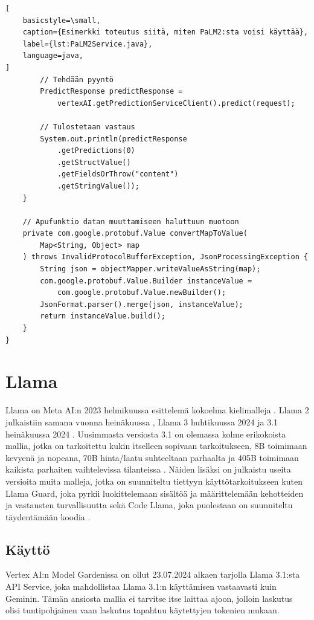 \begin{lstlisting}[
    basicstyle=\small,
    caption={Esimerkki toteutus siitä, miten PaLM2:sta voisi käyttää},
    label={lst:PaLM2Service.java},
    language=java,
]
        // Tehdään pyyntö
        PredictResponse predictResponse =
            vertexAI.getPredictionServiceClient().predict(request);

        // Tulostetaan vastaus
        System.out.println(predictResponse
            .getPredictions(0)
            .getStructValue()
            .getFieldsOrThrow("content")
            .getStringValue());
    }

    // Apufunktio datan muuttamiseen haluttuun muotoon
    private com.google.protobuf.Value convertMapToValue(
        Map<String, Object> map
    ) throws InvalidProtocolBufferException, JsonProcessingException {
        String json = objectMapper.writeValueAsString(map);
        com.google.protobuf.Value.Builder instanceValue =
            com.google.protobuf.Value.newBuilder();
        JsonFormat.parser().merge(json, instanceValue);
        return instanceValue.build();
    }
}
\end{lstlisting}

\section{Llama}

Llama on Meta AI:n 2023 helmikuussa esittelemä kokoelma kielimalleja
\parencite{llama1}. Llama 2 julkaistiin samana vuonna heinäkuussa
\parencite{llama2}, Llama 3 huhtikuussa 2024 \parencite{llama3} ja 3.1
heinäkuussa 2024 \parencite{llama31}. Uusimmasta versiosta 3.1 on olemassa
kolme erikokoista mallia, jotka on tarkoitettu kukin itselleen sopivaan
tarkoitukseen, 8B toimimaan kevyenä ja nopeana, 70B hinta/laatu suhteeltaan
parhaalta ja 405B toimimaan kaikista parhaiten vaihtelevissa tilanteissa
\parencite{llama}. Näiden lisäksi on julkaistu useita versioita muita malleja,
jotka on suunniteltu tiettyyn käyttötarkoitukseen kuten Llama Guard, joka
pyrkii luokittelemaan sisältöä ja määrittelemään kehotteiden ja vastausten
turvallisuutta \parencite{llamaGuard3} sekä Code Llama, joka puolestaan on
suunniteltu täydentämään koodia \parencite{llamaOtherModels}.

\subsection{Käyttö}

Vertex AI:n Model Gardenissa on ollut 23.07.2024 alkaen tarjolla Llama 3.1:sta
API Service, joka mahdollistaa Llama 3.1:n käyttämisen vastaavasti kuin
Geminin. Tämän ansiosta mallia ei tarvitse itse laittaa ajoon, jolloin laskutus
olisi tuntipohjainen vaan laskutus tapahtuu käytettyjen tokenien mukaan.
\parencite{vertexAiModelGardenLlama3}

